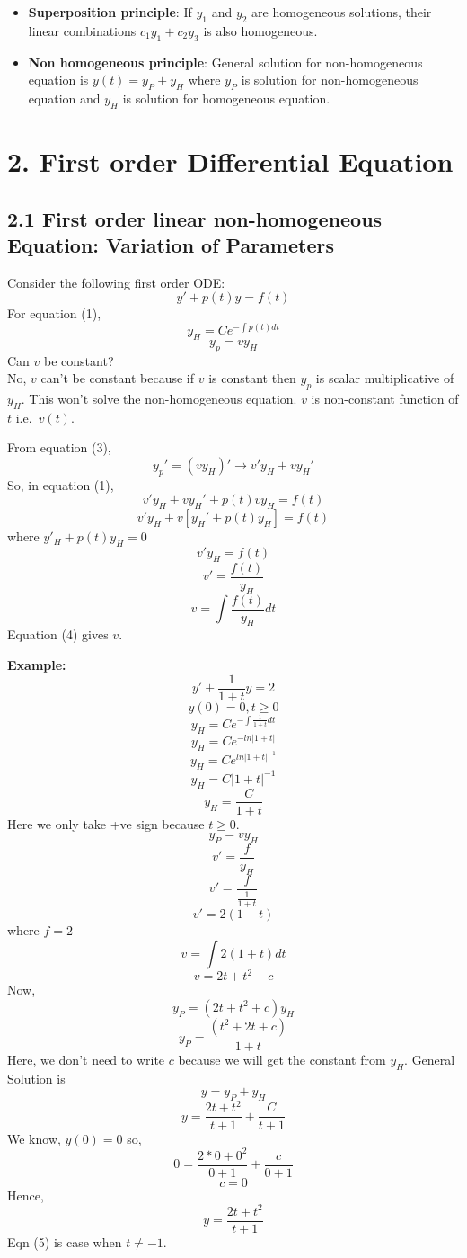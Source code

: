 \documentclass[
  11pt,
]{article}
\providecommand{\tightlist}{%
  \setlength{\itemsep}{0pt}\setlength{\parskip}{0pt}}
\begin{document}
\begin{itemize}
\tightlist
\item
  \textbf{Superposition principle}: If \(y_1\) and \(y_2\) are
  homogeneous solutions, their linear combinations \(c_1y_1 + c_2y_3\)
  is also homogeneous.
\item
  \textbf{Non homogeneous principle}: General solution for
  non-homogeneous equation is \(y(t) = y_P + y_H\) where \(y_P\) is
  solution for non-homogeneous equation and \(y_H\) is solution for
  homogeneous equation.
\end{itemize}

\newpage

\section{2. First order Differential
Equation}\label{first-order-differential-equation}

\subsection{2.1 First order linear non-homogeneous Equation: Variation
of
Parameters}\label{first-order-linear-non-homogeneous-equation-variation-of-parameters}

Consider the following first order ODE: \[y'+p(t)y=f(t) \tag{1}\] For
equation (1), \[y_H=Ce^{-\int{p(t)dt}} \tag{2}\] \[y_p=vy_H \tag{3}\]
Can \(v\) be constant?\\
No, \(v\) can't be constant because if \(v\) is constant then \(y_p\) is
scalar multiplicative of \(y_H\). This won't solve the non-homogeneous
equation. \(v\) is non-constant function of \(t\) i.e.~\(v(t)\).

From equation (3), \[y_p'=(vy_H)' \longrightarrow v'y_H+vy_H'\] So, in
equation (1), \[v'y_H+vy_H'+p(t)vy_H=f(t)\]
\[v'y_H+v[y_H'+p(t)y_H]=f(t)\] where \(y'_H+p(t)y_H=0\) \[v'y_H=f(t)\]
\[v'=\frac{f(t)}{y_H}\] \[v=\int\frac{f(t)}{y_H}dt \tag{4}\] Equation
(4) gives \(v\).

\textbf{Example:} \[y'+\frac{1}{1+t}y=2\] \[y(0)=0, t\geq0\]
\[y_H=Ce^{-\int\frac{1}{1+t}dt}\] \[y_H=Ce^{-ln|1+t|}\]
\[y_H=Ce^{ln|1+t|^{-1}}\] \[y_H=C|1+t|^{-1}\]
\[y_H=\frac{C}{1+t} \tag{1}\] Here we only take +ve sign because
\(t\geq0\). \[y_P=vy_H\] \[v'=\frac{f}{y_H}\]
\[v'=\frac{f}{\frac{1}{1+t}}\] \[v'=2(1+t)\] where \(f=2\)
\[v=\int{2(1+t)}dt\] \[v=2t+t^2+c \tag{2}\] Now, \[y_P=(2t+t^2+c)y_H\]
\[y_P=\frac{(t^2+2t+c)}{1+t} \tag{3}\] Here, we don't need to write
\(c\) because we will get the constant from \(y_H\). General Solution is
\[y=y_P+y_H\] \[y=\frac{2t+t^2}{t+1}+\frac{C}{t+1} \tag{4}\] We know,
\(y(0)=0\) so, \[0=\frac{2*0+0^2}{0+1}+\frac{c}{0+1}\] \[c=0\] Hence,
\[y=\frac{2t+t^2}{t+1} \tag{5}\] Eqn (5) is case when \(t\neq-1\).
\newpage
\end{document}
